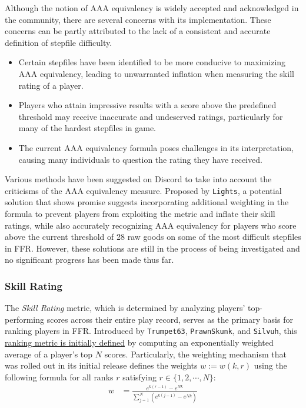 

Although the notion of AAA equivalency is widely accepted and acknowledged in the community, there are several concerns with its implementation. These concerns can be partly attributed to the lack of a consistent and accurate definition of stepfile difficulty.

\begin{itemize}
	\item Certain stepfiles have been identified to be more conducive to maximizing AAA equivalency, leading to unwarranted inflation when measuring the skill rating of a player.
	\item Players who attain impressive results with a score above the predefined threshold may receive inaccurate and undeserved ratings, particularly for many of the hardest stepfiles in game.
	\item The current AAA equivalency formula poses challenges in its interpretation, causing many individuals to question the rating they have received.
\end{itemize}

Various methods have been suggested on Discord to take into account the criticisms of the AAA equivalency measure. Proposed by \texttt{Lights}, a potential solution that shows promise suggests incorporating additional weighting in the formula to prevent players from exploiting the metric and inflate their skill ratings, while also accurately recognizing AAA equivalency for players who score above the current threshold of 28 raw goods on some of the most difficult stepfiles in FFR. However, these solutions are still in the process of being investigated and no significant progress has been made thus far.

\subsubsection{Skill Rating}

The \textit{Skill Rating} metric, which is determined by analyzing players' top-performing scores across their entire play record, serves as the primary basis for ranking players in FFR. Introduced by \texttt{Trumpet63}, \texttt{PrawnSkunk}, and \texttt{Silvuh}, this \href{https://www.flashflashrevolution.com/ffr/new-skill-based-ranking-system-leaderboards/}{ranking metric is initially defined} by computing an exponentially weighted average of a player's top $N$ scores. Particularly, the weighting mechanism that was rolled out in its initial release defines the weights $w := w(k, r)$ using the following formula for all ranks $r$ satisfying $r \in \{1, 2, \cdots, N\}$:
\begin{align*}
	w & = \frac{e^{k(r-1)} - e^{Nk}}{\displaystyle \sum_{j = 1}^{N} \left(e^{k(j-1)} - e^{Nk}\right)}
\end{align*}



